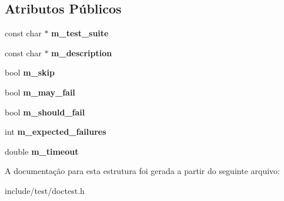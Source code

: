 \subsection*{Atributos Públicos}
\begin{DoxyCompactItemize}
\item 
\mbox{\label{structdoctest_1_1detail_1_1TestSuite_ab6260436f6fd52d473c0020ff916753c}} 
const char $\ast$ {\bfseries m\+\_\+test\+\_\+suite}
\item 
\mbox{\label{structdoctest_1_1detail_1_1TestSuite_a0458cf84f4f2d308162b26c95a1bbbce}} 
const char $\ast$ {\bfseries m\+\_\+description}
\item 
\mbox{\label{structdoctest_1_1detail_1_1TestSuite_a82ecf10ca3db6bff60a087378267caea}} 
bool {\bfseries m\+\_\+skip}
\item 
\mbox{\label{structdoctest_1_1detail_1_1TestSuite_aeaf438e6731c002c2447e8e87c46c82b}} 
bool {\bfseries m\+\_\+may\+\_\+fail}
\item 
\mbox{\label{structdoctest_1_1detail_1_1TestSuite_a3c5953ed157cfc68dfc37cce66fb4103}} 
bool {\bfseries m\+\_\+should\+\_\+fail}
\item 
\mbox{\label{structdoctest_1_1detail_1_1TestSuite_ab0167ce62046912d83780302cb86adca}} 
int {\bfseries m\+\_\+expected\+\_\+failures}
\item 
\mbox{\label{structdoctest_1_1detail_1_1TestSuite_a430d6e400dd91b9a21c7bb06ede81ec9}} 
double {\bfseries m\+\_\+timeout}
\end{DoxyCompactItemize}


A documentação para esta estrutura foi gerada a partir do seguinte arquivo\+:\begin{DoxyCompactItemize}
\item 
include/test/doctest.\+h\end{DoxyCompactItemize}
